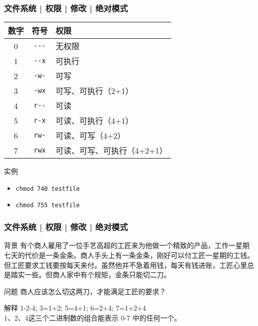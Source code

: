 \begin{frame}[fragile]
  \frametitle{文件系统 | 权限 | 修改 | \alert{绝对模式}}
  \begin{table}
    \centering
    \begin{tabular}{ccl}
      \hline
      \rowcolor{blue!50}数字 & 符号 & 权限\\
      \hline
      0 & \verb|---| & 无权限\\
      1 & \verb|--x| & 可执行\\
      2 & \verb|-w-| & 可写\\
      3 & \verb|-wx| & 可写、可执行（2+1）\\
      4 & \verb|r--| & 可读\\
      5 & \verb|r-x| & 可读、可执行（4+1）\\
      6 & \verb|rw-| & 可读、可写（4+2）\\
      7 & \verb|rwx| & 可读、可写、可执行（4+2+1）\\
      \hline
    \end{tabular}
  \end{table}
  \pause
  \begin{block}{实例}
    \begin{itemize}
      \item \verb|chmod 740 testfile|
      \item \verb|chmod 755 testfile|
    \end{itemize}
  \end{block}
\end{frame}

\begin{frame}[fragile]
  \frametitle{文件系统 | 权限 | 修改 | 绝对模式}
  \begin{block}{背景}
有个商人雇用了一位手艺高超的工匠来为他做一个精致的产品，工作一星期七天的代价是一条金条。商人手头上有一条金条，刚好可以付工匠一星期的工钱。但工匠要求工钱要按每天来付。虽然他并不急着用钱，每天有钱进账，工匠心里总是踏实一些。但商人家中有个规矩，金条只能切二刀。
  \end{block}
  \pause
  \begin{block}{问题}
    商人应该怎么切这两刀，才能满足工匠的要求？
  \end{block}
  \pause
  \begin{block}{解释}
   1-2-4; 3=1+2; 5=4+1; 6=2+4; 7=1+2+4\\
1、2、4这三个二进制数的组合能表示 0-7 中的任何一个。
  \end{block}
\end{frame}

